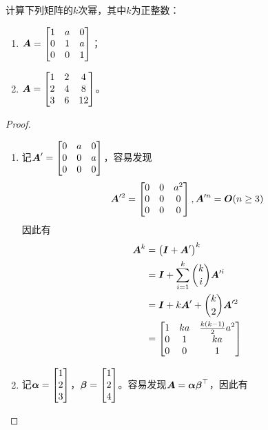 \begin{problem}
计算下列矩阵的\(k\)次幂，其中\(k\)为正整数：

\begin{enumerate}
    \item \(\boldsymbol{A}=\begin{bmatrix}1&a&0\\0&1&a\\0&0&1\end{bmatrix}\)；
    \item \(\boldsymbol{A}=\begin{bmatrix}1&2&4\\2&4&8\\3&6&12\end{bmatrix}\)。
\end{enumerate}
\end{problem}
\begin{proof}
    \begin{enumerate}
        \item 记\(\boldsymbol{A}'=\begin{bmatrix}0&a&0\\0&0&a\\0&0&0\end{bmatrix}\)，容易发现
              \begin{equation*}
                  \boldsymbol{A}'^2=\begin{bmatrix}0&0&a^2\\0&0&0\\0&0&0\end{bmatrix},\boldsymbol{A}'^n=\boldsymbol{O}(n\ge3)
              \end{equation*}
              因此有
              \begin{align*}
                  \boldsymbol{A}^k & =\left( \boldsymbol{I}+\boldsymbol{A}' \right)^k                 \\
                          & =\boldsymbol{I}+\sum_{i=1}^k\binom{k}{i}\boldsymbol{A}'^i \\
                          & =\boldsymbol{I}+k\boldsymbol{A}'+\binom{k}{2}\boldsymbol{A}'^2     \\
                          & =\begin{bmatrix}
                                 1 & ka & \frac{k(k-1)}{2}a^2 \\
                                 0 & 1  & ka                  \\
                                 0 & 0  & 1
                             \end{bmatrix}
              \end{align*}
        \item 记\(\boldsymbol{\alpha}=\begin{bmatrix}1\\2\\3\end{bmatrix}\)，\(\boldsymbol{\beta}=\begin{bmatrix}1\\2\\4\end{bmatrix}\)。容易发现\(\boldsymbol{A}=\boldsymbol{\alpha}\boldsymbol{\beta}^\top\)，因此有

\end{enumerate}
\end{proof}
